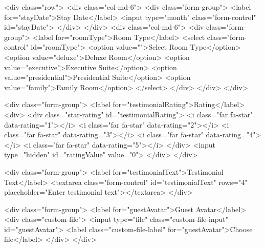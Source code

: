                     <div class="row">
                        <div class="col-md-6">
                            <div class="form-group">
                                <label for="stayDate">Stay Date</label>
                                <input type="month" class="form-control" id="stayDate">
                            </div>
                        </div>
                        <div class="col-md-6">
                            <div class="form-group">
                                <label for="roomType">Room Type</label>
                                <select class="form-control" id="roomType">
                                    <option value="">Select Room Type</option>
                                    <option value="deluxe">Deluxe Room</option>
                                    <option value="executive">Executive Suite</option>
                                    <option value="presidential">Presidential Suite</option>
                                    <option value="family">Family Room</option>
                                </select>
                            </div>
                        </div>
                    </div>
                    
                    <div class="form-group">
                        <label for="testimonialRating">Rating</label>
                        <div>
                            <div class="star-rating" id="testimonialRating">
                                <i class="far fa-star" data-rating="1"></i>
                                <i class="far fa-star" data-rating="2"></i>
                                <i class="far fa-star" data-rating="3"></i>
                                <i class="far fa-star" data-rating="4"></i>
                                <i class="far fa-star" data-rating="5"></i>
                            </div>
                            <input type="hidden" id="ratingValue" value="0">
                        </div>
                    </div>
                    
                    <div class="form-group">
                        <label for="testimonialText">Testimonial Text</label>
                        <textarea class="form-control" id="testimonialText" rows="4" placeholder="Enter testimonial text"></textarea>
                    </div>
                    
                    <div class="form-group">
                        <label for="guestAvatar">Guest Avatar</label>
                        <div class="custom-file">
                            <input type="file" class="custom-file-input" id="guestAvatar">
                            <label class="custom-file-label" for="guestAvatar">Choose file</label>
                        </div>
                    </div>
                    
